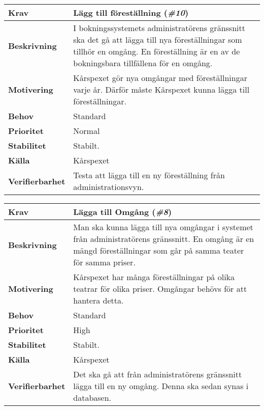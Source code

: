\documentclass[a4paper, twoside, 11pt, titlepage]{article}
\begin{document}
		\begin{tabular} { p{2.6cm} p{12.5cm} }
			\hline
			\sffamily\textbf{Krav} & Lägg till föreställning (\emph{\#10})  \\
			\hline
			\sffamily\textbf{Beskrivning} & I bokningssystemets administratörens gränssnitt ska det gå att lägga till nya föreställningar som tillhör en omgång. En föreställning är en av de bokningsbara tillfällena för en omgång.  \\
			\hline
			\sffamily\textbf{Motivering} & Kårspexet gör nya omgångar med föreställningar varje år. Därför måste Kårspexet kunna lägga till föreställningar.  \\
			\hline
			\sffamily\textbf{Behov} & Standard  \\
			\hline
			\sffamily\textbf{Prioritet} & Normal  \\
			\hline
			\sffamily\textbf{Stabilitet} & Stabilt.  \\
			\hline
			\sffamily\textbf{Källa} & Kårspexet  \\
			\hline
			\sffamily\textbf{Verifierbarhet} & Testa att lägga till en ny föreställning från administrationsvyn.  \\
			\hline
		\end{tabular}
		\vspace{6mm}

		\begin{tabular} { p{2.6cm} p{12.5cm} }
			\hline
			\sffamily\textbf{Krav} & Lägga till Omgång (\emph{\#8})  \\
			\hline
			\sffamily\textbf{Beskrivning} & Man ska kunna lägga till nya omgångar i systemet från administratörens gränssnitt. En omgång är en mängd föreställningar som går på samma teater för samma priser.  \\
			\hline
			\sffamily\textbf{Motivering} & Kårspexet har många föreställningar på olika teatrar för olika priser. Omgångar behövs för att hantera detta.  \\
			\hline
			\sffamily\textbf{Behov} & Standard  \\
			\hline
			\sffamily\textbf{Prioritet} & High  \\
			\hline
			\sffamily\textbf{Stabilitet} & Stabilt.  \\
			\hline
			\sffamily\textbf{Källa} & Kårspexet  \\
			\hline
			\sffamily\textbf{Verifierbarhet} & Det ska gå att från administratörens gränssnitt lägga till en ny omgång. Denna ska sedan synas i databasen.   \\
			\hline
		\end{tabular}
		\vspace{6mm}
\end{document}
